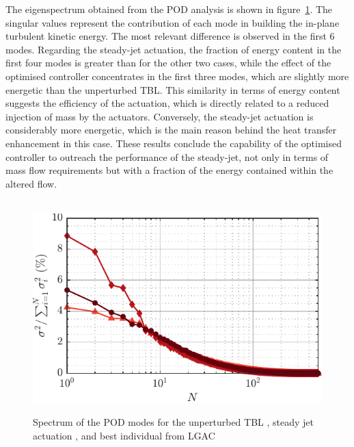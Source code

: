 The eigenspectrum obtained from the POD analysis is shown in figure~\ref{fig:POD_spectrum}. The singular values represent the contribution of each mode in building the in-plane turbulent kinetic energy. The most relevant difference is observed in the first $6$ modes. Regarding the steady-jet actuation, the fraction of energy content in the first four modes is greater than for the other two cases, while the effect of the optimised controller concentrates in the first three modes, which are slightly more energetic than the unperturbed TBL. This similarity in terms of energy content suggests the efficiency of the actuation, which is directly related to a reduced injection of mass by the actuators. Conversely, the steady-jet actuation is considerably more energetic, which is the main reason behind the heat transfer enhancement in this case. These results conclude the capability of the optimised controller to outreach the performance of the steady-jet, not only in terms of mass flow requirements but with a fraction of the energy contained within the altered flow.

\begin{figure}[t] %
    \centering\
    \includegraphics[width=0.65\linewidth]{figures/F12.pdf}
    \caption{Spectrum of the POD modes for the unperturbed TBL , steady jet actuation , and best individual from LGAC }
    \label{fig:POD_spectrum}
\end{figure}

